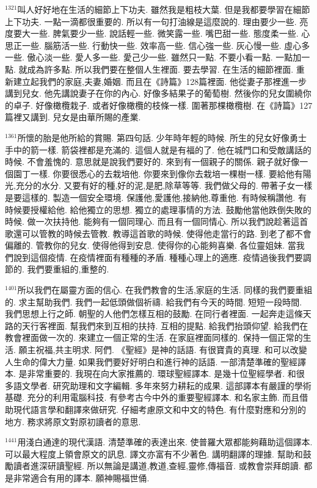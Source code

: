 \documentclass{book}
\begin{document}
$^{1321}$叫人好好地在生活的細節上下功夫.
雖然我是粗枝大葉.
但是我都要學習在細節上下功夫.
一點一滴都很重要的.
所以有一句打油線是這麼說的.
理由要少一些.
亮度要大一些.
脾氣要少一些.
說話輕一些.
微笑露一些.
嘴巴甜一些.
態度柔一些.
心思正一些.
腦筋活一些.
行動快一些.
效率高一些.
信心強一些.
灰心慢一些.
虛心多一些.
傲心淡一些.
愛人多一些.
愛己少一些.
雖然只一點.
不要小看一點.
一點加一點.
就成為許多點.
所以我們要在整個人生裡面.
要去學習.
在生活的細節裡面.
重新建立起我們的家庭,夫妻,婚姻.
而且在《詩篇》128篇裡面.
他從妻子那裡進一步講到兒女.
他先講說妻子在你的內心.
好像多結果子的葡萄樹.
然後你的兒女圍繞你的卓子.
好像橄欖栽子.
或者好像橄欖的枝條一樣.
圍著那棵橄欖樹.
在《詩篇》127篇裡又講到.
兒女是由華所賜的產業.

$^{1361}$所懷的胎是他所給的賞賜.
第四句話.
少年時年輕的時候.
所生的兒女好像勇士手中的箭一樣.
箭袋裡都是充滿的.
這個人就是有福的了.
他在城門口和受敵講話的時候.
不會羞愧的.
意思就是說我們要好的.
來到有一個親子的關係.
親子就好像一個園丁一樣.
你要很悉心的去栽培他.
你要來到像你去栽培一棵樹一樣.
要給他有陽光,充分的水分.
又要有好的種,好的泥,是肥,除草等等.
我們做父母的.
帶著子女一樣是要這樣的.
製造一個安全環境.
保護他,愛護他,接納他,尊重他.
有時候稱讚他.
有時候要授權給他.
給他獨立的思想.
獨立的處理事情的方法.
鼓勵他當他跌倒失敗的時候.
做一次扶持他.
能夠有一個同理心.
而且有一個同情心.
所以我們說趁著這首歌還可以管教的時候去管教.
教導這首歌的時候.
使得他走當行的路.
到老了都不會偏離的.
管教你的兒女.
使得他得到安息.
使得你的心能夠喜樂.
各位靈姐妹.
當我們說到這個疫情.
在疫情裡面有種種的矛盾.
種種心理上的適應.
疫情過後我們要調節的.
我們要重組的,重整的.

$^{1401}$所以我們在屬靈方面的信心.
在我們教會的生活,家庭的生活.
同樣的我們要重組的.
求主幫助我們.
我們一起低頭做個祈禱.
給我們有今天的時間.
短短一段時間.
我們思想上行之師.
朝聖的人他們怎樣互相的鼓勵.
在同行者裡面.
一起奔走這條天路的天行客裡面.
幫我們來到互相的扶持.
互相的提點.
給我們抬頭仰望.
給我們在教會裡面做一次的.
來建立一個正常的生活.
在家庭裡面同樣的.
保持一個正常的生活.
願主祝福,共主明求.
阿們.
《聖經》是神的話語.
有很寶貴的真理.
和可以改變人生命的偉大力量.
如果我們要好好明白和進行神的話語.
一部清楚準確的聖經譯本.
是非常重要的.
我現在向大家推薦的.
環球聖經譯本.
是幾十位聖經學者.
和很多語文學者.
研究助理和文字編輯.
多年來努力耕耘的成果.
這部譯本有嚴謹的學術基礎.
充分的利用電腦科技.
有參考古今中外的重要聖經譯本.
和名家主飾.
而且借助現代語言學和翻譯來做研究.
仔細考慮原文和中文的特色.
有什麼對應和分別的地方.
務求將原文對原初讀者的意思.

$^{1441}$用淺白通達的現代漢語.
清楚準確的表達出來.
使普羅大眾都能夠藉助這個譯本.
可以最大程度上領會原文的訊息.
譯文亦富有不少著色.
講明翻譯的理據.
幫助和鼓勵讀者進深研讀聖經.
所以無論是講道,教道,查經,靈修,傳福音.
或教會崇拜朗讀.
都是非常適合有用的譯本.
願神賜福世俑.
\newpage
\end{document}
